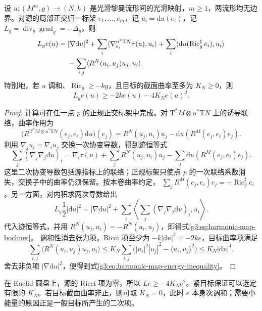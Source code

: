 \begin{proposition}\label{g3:prop:harmonic-map-bochner}
	设 \(u:(M^m,g)\to(N,h)\) 是光滑黎曼流形间的光滑映射，\(m\ge1\)，两流形均无边界。对源的局部正交归一标架 \(e_1,\ldots,e_m\)，记 \(u_i=\mathrm du(e_i)\)，记 \(L_g=\operatorname{div}_g\operatorname{grad}_g=-\Delta_g\)，则
	\begin{align}
		L_g e(u)
		={}&|\nabla\mathrm du|^2+\sum_i\langle\nabla^{u^*\mathrm TN}_{e_i}\tau(u),u_i\rangle
		+\sum_i\langle\mathrm du(\operatorname{Ric}_g^{\sharp}e_i),u_i\rangle\notag\\
		&-\sum_{i,j}\langle R^N(u_i,u_j)u_j,u_i\rangle.
		\label{g3:eq:harmonic-map-bochner}
	\end{align}
	特别地，若 \(u\) 调和、\(\operatorname{Ric}_g\ge-k g\)，且目标的截面曲率至多为 \(K_N\ge0\)，则
	\begin{equation}\label{g3:eq:harmonic-map-energy-inequality}
		L_g e(u)\ge-2k e(u)-4K_N e(u)^2.
	\end{equation}
\end{proposition}
\begin{proof}
	计算可在任一点 \(p\) 的正规正交标架中完成。对 \(\mathrm T^*M\otimes u^*\mathrm TN\) 上的诱导联络，曲率作用为
	\[
		\bigl(R^{\mathrm T^*M\otimes u^*\mathrm TN}(e_j,e_i)\mathrm du\bigr)(e_j)
		=R^N(u_j,u_i)u_j-\mathrm du(R^M(e_j,e_i)e_j).
	\]
	利用 \(\nabla_j u_i=\nabla_i u_j\) 交换一次协变导数，得到迹恒等式
	\[
		\sum_j(\nabla_j\nabla_j\mathrm du)_i
		=\nabla_i\tau(u)+\sum_jR^N(u_j,u_i)u_j
		-\sum_j\mathrm du(R^M(e_j,e_i)e_j).
	\]
	这里二次协变导数包括源指标上的联络；正规标架只使点 \(p\) 的一次联络系数消失，交换子中的曲率仍须保留。按本卷曲率约定，
	\(\sum_jR^M(e_j,e_i)e_j=-\operatorname{Ric}_g^{\sharp}e_i\)。另一方面，对内积求两次导数给出
	\[
		L_g\frac12|\mathrm du|^2
		=|\nabla\mathrm du|^2+\sum_i\left\langle
		\sum_j(\nabla_j\nabla_j\mathrm du)_i,u_i\right\rangle.
	\]
	代入迹恒等式，并用 \(R^N(u_j,u_i)=-R^N(u_i,u_j)\)，即得式\eqref{g3:eq:harmonic-map-bochner}。
	调和性消去张力项。Ricci 项至少为 \(-k|\mathrm du|^2=-2ke\)，目标曲率项满足
	\[
		\sum_{i,j}\langle R^N(u_i,u_j)u_j,u_i\rangle
		\le K_N\sum_{i,j}\bigl(|u_i|^2|u_j|^2-\langle u_i,u_j\rangle^2\bigr)
		\le K_N|\mathrm du|^4.
	\]
	舍去非负项 \(|\nabla\mathrm du|^2\)，便得到式\eqref{g3:eq:harmonic-map-energy-inequality}。
\end{proof}

在 Euclid 圆盘上，源的 Ricci 项为零，所以 \(Le\ge-4K_Ne^2\)。紧目标保证可以选定有限的 \(K_N\)。若目标截面曲率非正，则可取 \(K_N=0\)，此时 \(e\) 本身次调和；需要小能量的原因正是一般目标所产生的二次项。


